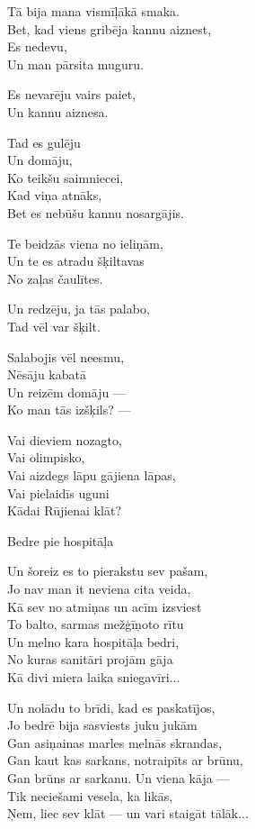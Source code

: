 \documentclass[14pt]{extarticle}
\begin{document}
Tā bija mana vismīļākā smaka.\\
Bet, kad viens gribēja kannu aiznest,\\
Es nedevu,\\
Un man pārsita muguru.

Es nevarēju vairs paiet,\\
Un kannu aiznesa.

Tad es gulēju\\
Un domāju,\\
Ko teikšu saimniecei,\\
Kad viņa atnāks,\\
Bet es nebūšu kannu nosargājis.


\newpage

{\bf *}

Te beidzās viena no ieliņām,\\
Un te es atradu šķiltavas\\
No zaļas čaulītes.

Un redzēju, ja tās palabo,\\
Tad vēl var šķilt.

Salabojis vēl neesmu,\\
Nēsāju kabatā\\
Un reizēm domāju ---\\
Ko man tās izšķils? ---

Vai dieviem nozagto,\\
Vai olimpisko,\\
Vai aizdegs lāpu gājiena lāpas,\\
Vai pielaidīs uguni\\
Kādai Rūjienai klāt?



\newpage

{\large \sc Bedre pie hospitāļa}

Un šoreiz es to pierakstu sev pašam,\\
Jo nav man it neviena cita veida,\\
Kā sev no atmiņas un acīm izsviest\\
To balto, sarmas mežģīņoto rītu\\
Un melno kara hospitāļa bedri,\\
No kuras sanitāri projām gāja\\
Kā divi miera laika sniegavīri...

Un nolādu to brīdi, kad es paskatījos,\\
Jo bedrē bija sasviests juku jukām\\
Gan asiņainas marles melnās skrandas,\\
Gan kaut kas sarkans, notraipīts ar brūnu,\\
Gan brūns ar sarkanu. Un viena kāja ---\\
Tik neciešami vesela, ka likās,\\
Ņem, liec sev klāt --- un vari staigāt tālāk...
\end{document}
